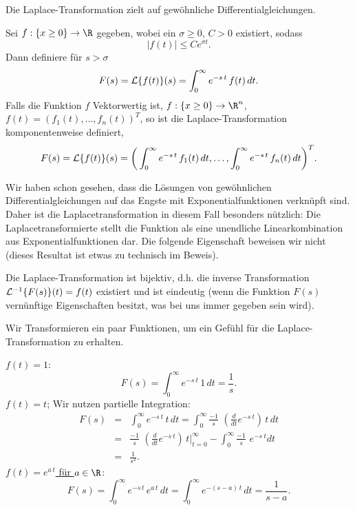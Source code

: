 Die Laplace-Transformation zielt auf gew\"ohnliche Differentialgleichungen. 
\begin{sdefi}
Sei $f:\{x\geq 0\}\rightarrow \R$ gegeben, wobei ein $\sigma\geq 0$, $C>0$ existiert, sodass
$$ |f(t)|\leq C e^{\sigma t}.$$
Dann definiere f\"ur $s>\sigma$
$$ F(s) = {\cal L}\{f(t)\}(s) = \int_0^\infty e^{-s\, t}\,f(t)\, dt.$$
Falls die Funktion $f$ Vektorwertig ist, $f:\{x\geq 0\}\rightarrow \R^n$, $f(t)=(f_1(t),\ldots,f_n(t))^T$, 
so ist die Laplace-Transformation komponentenweise definiert, 
$$ F(s) = {\cal L}\{f(t)\}(s) = 
\bigg(
\int_0^\infty e^{-s\, t}\,f_1(t)\, dt,\ldots,
\int_0^\infty e^{-s\, t}\,f_n(t)\, dt
 \bigg)^T.$$
\end{sdefi}\par\medskip

Wir haben schon gesehen, dass die L\"osungen von gew\"ohnlichen Differentialgleichungen 
auf das Engste mit Exponentialfunktionen verkn\"upft sind. Daher ist die Laplacetransformation 
in diesem Fall besonders n\"utzlich: Die Laplacetransformierte stellt die 
Funktion als eine unendliche Linearkombination aus Exponentialfunktionen dar. 
Die folgende Eigenschaft 
beweisen wir nicht (dieses Resultat ist etwas zu 
technisch im Beweis). 

\begin{ssatz}
Die Laplace-Transformation ist bijektiv, d.h. die inverse Transformation 
${\cal L}^{-1}\{F(s)\}(t) = f(t)$ existiert und ist eindeutig (wenn die Funktion $F(s)$ vern\"unftige 
Eigenschaften besitzt, was bei uns immer gegeben sein wird).
\end{ssatz}

Wir Transformieren ein paar Funktionen, um ein Gef\"uhl f\"ur die Laplace-Transformation 
zu erhalten.
\begin{bspX}
\underline{$f(t) = 1$}:\\
$$ F(s) = \int_0^\infty e^{-s\ t} \, 1\, dt = \frac 1 s.$$
\underline{$f(t) = t$}; Wir nutzen partielle Integration:
\begin{eqnarray*} 
F(s) 
&=& \int_0^\infty e^{-s\ t} \, t\, dt 
= \int_0^\infty \frac {-1}{s}\,\,\left(\frac d {dt}e^{-s\ t}\right) \, t\, dt \\
&=& \frac {-1}{s}\,\,\left(\frac d {dt}e^{-s\ t}\right) \, t\bigg|_{t=0}^\infty 
- \int_0^\infty \frac {-1}{s}\,\,e^{-s\ t} dt \\
&=& \frac 1 {s^2}.
\end{eqnarray*}
\underline{$f(t)=e^{a\, t}$ f\"ur $a\in\R$}:\\
$$F(s) 
= \int_0^\infty e^{-s \, t}\, e^{a\, t}\, dt 
= \int_0^\infty e^{-(s-a) \, t}\, dt 
= \frac {1}{s-a}.
$$
\end{bspX}

